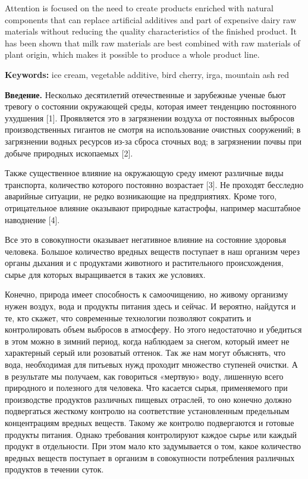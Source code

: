 Attention is focused on the need to create products enriched with
natural components that can replace artificial additives and part of
expensive dairy raw materials without reducing the quality
characteristics of the finished product. It has been shown that milk raw
materials are best combined with raw materials of plant origin, which
makes it possible to produce a whole product line.

{\bfseries Keywords:} ice cream, vegetable additive, bird cherry, irga,
mountain ash red

\begin{multicols}{2}
{\bfseries Введение.} Несколько десятилетий отечественные и зарубежные
ученые бьют тревогу о состоянии окружающей среды, которая имеет
тенденцию постоянного ухудшения {[}1{]}. Проявляется это в загрязнении
воздуха от постоянных выбросов производственных гигантов не смотря на
использование очистных сооружений; в загрязнении водных ресурсов из-за
сброса сточных вод; в загрязнении почвы при добыче природных ископаемых
{[}2{]}.

Также существенное влияние на окружающую среду имеют различные виды
транспорта, количество которого постоянно возрастает {[}3{]}. Не
проходят бесследно аварийные ситуации, не редко возникающие на
предприятиях. Кроме того, отрицательное влияние оказывают природные
катастрофы, например масштабное наводнение {[}4{]}.

Все это в совокупности оказывает негативное влияние на состояние
здоровья человека. Большое количество вредных веществ поступает в наш
организм через органы дыхания и с продуктами животного и растительного
происхождения, сырье для которых выращивается в таких же условиях.

Конечно, природа имеет способность к самоочищению, но живому организму
нужен воздух, вода и продукты питания здесь и сейчас. И вероятно,
найдутся и те, кто скажет, что современные технологии позволяют
сократить и контролировать объем выбросов в атмосферу. Но этого
недостаточно и убедиться в этом можно в зимний период, когда наблюдаем
за снегом, который имеет не характерный серый или розоватый оттенок. Так
же нам могут объяснять, что вода, необходимая для питьевых нужд проходит
множество ступеней очистки. А в результате мы получаем, как говориться
«мертвую» воду, лишенную всего природного и полезного для человека. Что
касается сырья, применяемого при производстве продуктов различных
пищевых отраслей, то оно конечно должно подвергаться жесткому контролю
на соответствие установленным предельным концентрациям вредных веществ.
Такому же контролю подвергаются и готовые продукты питания. Однако
требования контролируют каждое сырье или каждый продукт в отдельности.
При этом мало кто задумывается о том, какое количество вредных веществ
поступает в организм в совокупности потребления различных продуктов в
течении суток.


\end{multicols}
